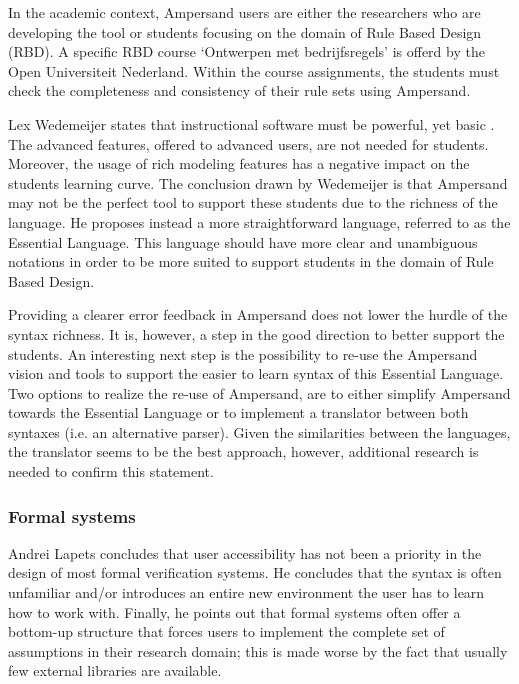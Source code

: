 %
In the academic context, Ampersand users are either the researchers who are developing the tool or students focusing on the domain of Rule Based Design (RBD).
A specific RBD course `Ontwerpen met bedrijfsregels' is offerd by the Open Universiteit Nederland.
Within the course assignments, the students must check the completeness and consistency of their rule sets using Ampersand. 

Lex Wedemeijer states that instructional software must be powerful, yet basic .
The advanced features, offered to advanced users, are not needed for students.
Moreover, the usage of rich modeling features has a negative impact on the students learning curve.
The conclusion drawn by Wedemeijer is that Ampersand may not be the perfect tool to support these students due to the richness of the language.
He proposes instead a more straightforward language, referred to as the Essential Language.
This language should have more clear and unambiguous notations in order to be more suited to support students in the domain of Rule Based Design.

Providing a clearer error feedback in Ampersand does not lower the hurdle of the syntax richness.
It is, however, a step in the good direction to better support the students. 
An interesting next step is the possibility to re-use the Ampersand vision and tools to support the easier to learn syntax of this Essential Language.
Two options to realize the re-use of Ampersand, are to either simplify Ampersand towards the Essential Language or to implement a translator between both syntaxes (i.e. an alternative parser).
Given the similarities between the languages, the translator seems to be the best approach, however, additional research is needed to confirm this statement.

\subsubsection{Formal systems}
Andrei Lapets  concludes that user accessibility has not been a priority in the design of most formal verification systems.
He concludes that the syntax is often unfamiliar and/or introduces an entire new environment the user has to learn how to work with.
Finally, he points out that formal systems often offer a bottom-up structure that forces users to implement the complete set of assumptions in their research domain; this is made worse by the fact that usually few external libraries are available.

